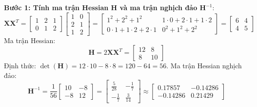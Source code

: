 \begin{example}
\textbf{Bước 1: Tính ma trận Hessian $\mathbf{H}$ và ma trận nghịch đảo $\mathbf{H}^{-1}$}:
\begin{equation*}
\mathbf{X} \mathbf{X}^T = \begin{bmatrix} 1 & 2 & 1 \\ 0 & 1 & 2 \end{bmatrix} \begin{bmatrix} 1 & 0 \\ 2 & 1 \\ 1 & 2 \end{bmatrix} = \begin{bmatrix} 1^2 + 2^2 + 1^2 & 1\cdot 0 + 2\cdot 1 + 1\cdot 2 \\ 0\cdot 1 + 1\cdot 2 + 2\cdot 1 & 0^2 + 1^2 + 2^2 \end{bmatrix} = \begin{bmatrix} 6 & 4 \\ 4 & 5 \end{bmatrix}
\end{equation*}
Ma trận Hessian:
\begin{equation*}
\mathbf{H} = 2 \mathbf{X} \mathbf{X}^T = \begin{bmatrix} 12 & 8 \\ 8 & 10 \end{bmatrix}
\end{equation*}
Định thức: $\det(\mathbf{H}) = 12 \cdot 10 - 8 \cdot 8 = 120 - 64 = 56$.
Ma trận Hessian nghịch đảo:
\begin{equation*}
\mathbf{H}^{-1} = \frac{1}{56} \begin{bmatrix} 10 & -8 \\ -8 & 12 \end{bmatrix} = \begin{bmatrix} \frac{5}{28} & -\frac{1}{7} \\ -\frac{1}{7} & \frac{3}{14} \end{bmatrix} \approx \begin{bmatrix} 0.17857 & -0.14286 \\ -0.14286 & 0.21429 \end{bmatrix}
\end{equation*}


\end{example}
